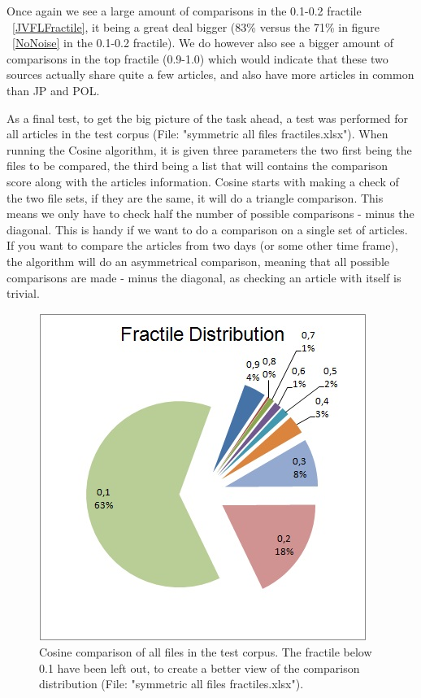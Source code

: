 Once again we see a large amount of comparisons in the 0.1-0.2 fractile ~\ref{JVFLFractile}, it being a great deal bigger (83\% versus the 71\% in figure ~\ref{NoNoise} in the 0.1-0.2 fractile). We do however also see a bigger amount of comparisons in the top fractile (0.9-1.0) which would indicate that these two sources actually share quite a few articles, and also have more articles in common than JP and POL.

As a final test, to get the big picture of the task ahead, a test was performed for all articles in the test corpus (File: "symmetric all files fractiles.xlsx"). When running the Cosine algorithm, it is given three parameters the two first being the files to be compared, the third being a list that will contains the comparison score along with the articles information. Cosine starts with making a check of the two file sets, if they are the same, it will do a triangle comparison. This means we only have to check half the number of possible comparisons - minus the diagonal. This is handy if we want to do a comparison on a single set of articles. If you want to compare the articles from two days (or some other time frame), the algorithm will do an asymmetrical comparison, meaning that all possible comparisons are made - minus the diagonal, as checking an article with itself is trivial.

\begin{figure}
	\centering
	\includegraphics[scale=1.0]{figures/AllFilesFractile}
	\caption{Cosine comparison of all files in the test corpus. The fractile below 0.1 have been left out, to create a better view of the comparison distribution (File: "symmetric all files fractiles.xlsx").}
	\label{Fractles}
\end{figure}



